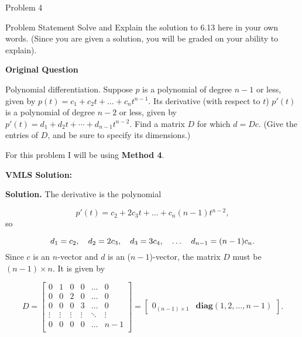 \begin{problem}{Problem 4}
    \begin{statement}{Problem Statement}
        Solve and Explain the solution to 6.13 here in your own words. (Since you are given a solution, you will be graded on your ability to explain). \vspace*{1em}

        \noindent \textbf{Original Question} \vspace*{1em}

        Polynomial differentiation. Suppose $p$ is a polynomial of degree $n-1$ or less, given by $p(t) = c_{1} + c_{2}t + \dots + c_{n}t^{n-1}$. Its derivative (with respect to $t$) $p'(t)$ is a 
        polynomial of degree $n-2$ or less, given by $p'(t) = d_{1} + d_{2}t + \cdots + d_{n-1}t^{n-2}$. Find a matrix $D$ for which $d = Dc$. (Give the entries of $D$, and be sure to specify its dimensions.)
    \end{statement}

    \begin{highlight}[Solution]
        For this problem I will be using \textbf{Method 4}. \vspace*{1em}

        \noindent \textbf{VMLS Solution:} \vspace*{1em}

        \textbf{Solution.} The derivative is the polynomial

        \begin{equation*}
            p'(t) = c_{2} + 2c_{3}t + \dots + c_{n}(n-1)t^{n-2},
        \end{equation*}
        so

        \begin{equation*}
            d_{1} = c_{2}, \hspace*{10pt} d_{2} = 2c_{3}, \hspace*{10pt} d_{3} = 3c_{4}, \hspace*{10pt} \dots \hspace*{10pt} d_{n-1}=(n-1)c_{n}.
        \end{equation*}
        Since $c$ is an $n$-vector and $d$ is an ($n-1$)-vector, the matrix $D$ must be $(n-1)\times n$. It is given by

        \begin{equation*}
            D = 
            \begin{bmatrix}
                0 & 1 & 0 & 0 & \dots & 0 \\
                0 & 0 & 2 & 0 & \dots & 0 \\
                0 & 0 & 0 & 3 & \dots & 0 \\
                \vdots & \vdots & \vdots & \vdots & \ddots & \vdots \\
                0 & 0 & 0 & 0 & \dots & n - 1 \\
            \end{bmatrix}
            = 
            \begin{bmatrix}
                0_{(n-1)\times 1} & \mathbf{diag}(1,2,\dots,n-1)
            \end{bmatrix}.
        \end{equation*}


\end{highlight}
\end{problem}
